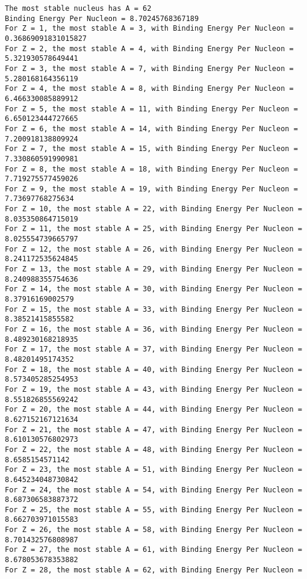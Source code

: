 \documentclass[11pt]{article}
\begin{document}
    \begin{Verbatim}[commandchars=\\\{\}]
The most stable nucleus has A = 62
Binding Energy Per Nucleon = 8.70245768367189
For Z = 1, the most stable A = 3, with Binding Energy Per Nucleon =
0.36869091831015827
For Z = 2, the most stable A = 4, with Binding Energy Per Nucleon =
5.321930578649441
For Z = 3, the most stable A = 7, with Binding Energy Per Nucleon =
5.280168164356119
For Z = 4, the most stable A = 8, with Binding Energy Per Nucleon =
6.466330085889912
For Z = 5, the most stable A = 11, with Binding Energy Per Nucleon =
6.650123444727665
For Z = 6, the most stable A = 14, with Binding Energy Per Nucleon =
7.200918138809924
For Z = 7, the most stable A = 15, with Binding Energy Per Nucleon =
7.330860591990981
For Z = 8, the most stable A = 18, with Binding Energy Per Nucleon =
7.719275577459026
For Z = 9, the most stable A = 19, with Binding Energy Per Nucleon =
7.73697768275634
For Z = 10, the most stable A = 22, with Binding Energy Per Nucleon =
8.035350864715019
For Z = 11, the most stable A = 25, with Binding Energy Per Nucleon =
8.025554739665797
For Z = 12, the most stable A = 26, with Binding Energy Per Nucleon =
8.241172535624845
For Z = 13, the most stable A = 29, with Binding Energy Per Nucleon =
8.240988355754636
For Z = 14, the most stable A = 30, with Binding Energy Per Nucleon =
8.37916169002579
For Z = 15, the most stable A = 33, with Binding Energy Per Nucleon =
8.38521415855582
For Z = 16, the most stable A = 36, with Binding Energy Per Nucleon =
8.489230168218935
For Z = 17, the most stable A = 37, with Binding Energy Per Nucleon =
8.48201495174352
For Z = 18, the most stable A = 40, with Binding Energy Per Nucleon =
8.573405285254953
For Z = 19, the most stable A = 43, with Binding Energy Per Nucleon =
8.551826855569242
For Z = 20, the most stable A = 44, with Binding Energy Per Nucleon =
8.627152167121634
For Z = 21, the most stable A = 47, with Binding Energy Per Nucleon =
8.610130576802973
For Z = 22, the most stable A = 48, with Binding Energy Per Nucleon =
8.6585154571142
For Z = 23, the most stable A = 51, with Binding Energy Per Nucleon =
8.645234048730842
For Z = 24, the most stable A = 54, with Binding Energy Per Nucleon =
8.687306583887372
For Z = 25, the most stable A = 55, with Binding Energy Per Nucleon =
8.662703971015583
For Z = 26, the most stable A = 58, with Binding Energy Per Nucleon =
8.701432576808987
For Z = 27, the most stable A = 61, with Binding Energy Per Nucleon =
8.678053678353882
For Z = 28, the most stable A = 62, with Binding Energy Per Nucleon =

\end{Verbatim}
\end{document}
